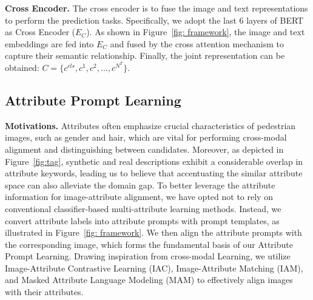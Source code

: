 \documentclass[sigconf]{acmart}
\begin{document}
\noindent\textbf{Cross Encoder.}
The cross encoder is to fuse the image and text representations to perform the prediction tasks. Specifically, we adopt the last 6 layers of BERT as Cross Encoder ($E_C$). As shown in Figure~\ref{fig: framework}, the image and text embeddings are fed into $E_C$ and fused by the cross attention mechanism to capture their semantic relationship. Finally, the joint representation can be obtained: $C = \{c^{cls}, c^1, c^2, ..., c^{N^T}\}$.


\subsection{Attribute Prompt Learning }

\textbf{Motivations.}
Attributes often emphasize crucial characteristics of pedestrian images, such as gender and hair, which are vital for performing cross-modal alignment and distinguishing between candidates. 
Moreover, as depicted in Figure~\ref{fig:tag}, synthetic and real descriptions exhibit a considerable overlap in attribute keywords, leading us to believe that accentuating the similar attribute space can also alleviate the domain gap. 
To better leverage the attribute information for image-attribute alignment, we have opted not to rely on conventional classifier-based multi-attribute learning methods.
Instead, we convert attribute labels into attribute prompts with prompt templates, as illustrated in Figure~\ref{fig: framework}. 
We then align the attribute prompts with the corresponding image, which forms the fundamental basis of our Attribute Prompt Learning.
Drawing inspiration from cross-modal Learning, we utilize Image-Attribute Contrastive Learning (IAC), Image-Attribute Matching (IAM), and Masked Attribute Language Modeling (MAM) to effectively align images with their attributes.
\end{document}
